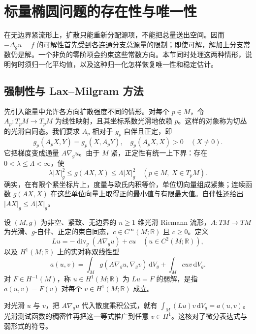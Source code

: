 \section{标量椭圆问题的存在性与唯一性}
\label{b2:sec:2603}

在无边界紧流形上，扩散只能重新分配源项，不能把总量送出空间。因而 \(-\Delta_gu=f\) 的可解性首先受到各连通分支总源量的限制；即使可解，解加上分支常数仍是解。一个非负的零阶项会约束这些常数方向。本节同时处理这两种情形，说明何时须归一化平均值，以及这种归一化怎样恢复唯一性和稳定估计。

\subsection{强制性与 Lax–Milgram 方法}
\label{b2:subsec:260301}

先引入能量中允许各方向扩散强度不同的情形。对每个 \(p\in M\)，令
\(A_p:T_pM\to T_pM\) 为线性映射，且其坐标系数光滑地依赖 \(p\)。这样的对象称为切丛的光滑自同态。我们要求 \(A_p\) 相对于 \(g_p\) 自伴且正定，即
\[
 g_p(A_pX,Y)=g_p(X,A_pY),
 \quad g_p(A_pX,X)>0\quad(X\ne0).
\]
它把梯度变成通量 \(A\nabla_g u\)。由于 \(M\) 紧，正定性有统一上下界：存在 \(0<\lambda\leq\Lambda<\infty\)，使
\begin{equation}
\label{b2:eq:26-A-ellipticity}
 \lambda|X|_g^2\leq g(AX,X)\leq\Lambda|X|_g^2
 \quad(p\in M,\ X\in T_pM).
\end{equation}
确实，在有限个紧坐标片上，度量与欧氏内积等价，单位切向量组成紧集；连续函数 \(g(AX,X)\) 在这些单位向量上取得正的最小值与有限最大值。自伴性还给出 \(|AX|_g\leq\Lambda|X|_g\)。

\begin{definition}[标量椭圆算子及其能量型]
\label{b2:def:26-elliptic-form}
设 \((M,g)\) 为非空、紧致、无边界的 \(n\geq1\) 维光滑 Riemann 流形，\(A:TM\to TM\) 为光滑、\(g\)-自伴、正定的束自同态，\(c\in C^\infty(M;\mathbb R)\) 且 \(c\geq0\)。定义
\[
 Lu=-\operatorname{div}_g(A\nabla_g u)+cu
 \quad(u\in C^2(M;\mathbb R)),
\]
以及 \(H^1(M;\mathbb R)\) 上的实对称双线性型
\begin{equation}
\label{b2:eq:26-elliptic-form}
 a(u,v)=\int_M g(A\nabla_g u,\nabla_g v)\,\mathrm dV_g
        +\int_Mcuv\,\mathrm dV_g.
\end{equation}
对 \(F\in H^{-1}(M)\)，称 \(u\in H^1(M;\mathbb R)\) 为 \(Lu=F\) 的弱解，是指
\(a(u,v)=F(v)\) 对每个 \(v\in H^1(M;\mathbb R)\) 成立。
\end{definition}

对光滑 \(u\) 与 \(v\)，把 \(A\nabla_g u\) 代入散度乘积公式，就有
\(\int_M(Lu)v\,\mathrm dV_g=a(u,v)\)。光滑测试函数的稠密性再把这一等式推广到任意 \(v\in H^1\)。这核对了微分表达式与弱形式的符号。

